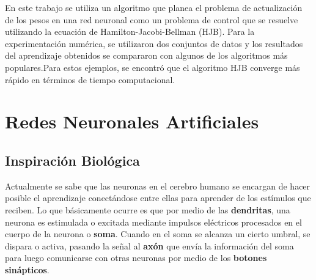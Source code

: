 \documentclass[11pt,letterpaper]{article}
\theoremstyle{definition}
\theoremstyle{definition}
\theoremstyle{definition}
\theoremstyle{definition}
\theoremstyle{definition}
\theoremstyle{definition}
\theoremstyle{definition}
\theoremstyle{definition}
\begin{document}
En este trabajo se utiliza un algoritmo que planea el problema de actualización de los pesos en una red neuronal como un problema de control que se resuelve utilizando la ecuación de Hamilton-Jacobi-Bellman (HJB). Para la experimentación numérica, se utilizaron dos conjuntos de datos y los resultados del aprendizaje obtenidos se compararon con algunos de los algoritmos más populares.Para estos ejemplos, se encontró que el algoritmo HJB converge más rápido en términos de tiempo computacional.

\section{Redes Neuronales Artificiales}
\subsection{Inspiración Biológica}
\begin{center}
\end{center}
Actualmente se sabe que las neuronas en el cerebro humano se encargan de hacer posible el aprendizaje conectándose entre ellas para aprender de los estímulos que reciben.  Lo que básicamente ocurre es que por medio de las \textbf{dendritas}, una neurona es estimulada o excitada mediante impulsos eléctricos procesados en el cuerpo de la neurona o \textbf{soma}. Cuando en el soma se alcanza un cierto umbral, se dispara o activa, pasando la señal al \textbf{axón} que envía la información del soma para luego comunicarse con otras neuronas por medio de los \textbf{botones sinápticos}.
\end{document}
